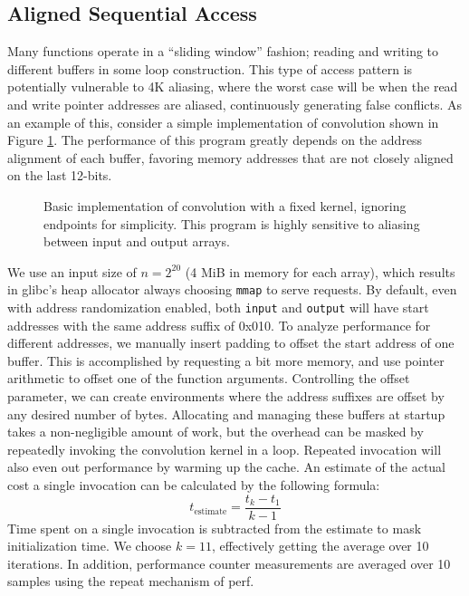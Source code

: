 \documentclass[10pt, conference, compsocconf]{IEEEtran}
\begin{document}
\subsection{Aligned Sequential Access}
Many functions operate in a ``sliding window'' fashion; reading and writing to different buffers in some loop construction.
This type of access pattern is potentially vulnerable to 4K aliasing, where the worst case will be when the read and write pointer addresses are aliased, continuously generating false conflicts.
As an example of this, consider a simple implementation of convolution shown in Figure \ref{lst:conv}.
The performance of this program greatly depends on the address alignment of each buffer, favoring memory addresses that are not closely aligned on the last 12-bits.

\begin{figure}[t]
  \centering
  
  \caption{Basic implementation of convolution with a fixed kernel, ignoring endpoints for simplicity. This program is highly sensitive to aliasing between input and output arrays.}
  \label{lst:conv}
\end{figure}

We use an input size of $n=2^{20}$ (4 MiB in memory for each array), which results in glibc's heap allocator always choosing \texttt{mmap} to serve requests.
By default, even with address randomization enabled, both \texttt{input} and \texttt{output} will have start addresses with the same address suffix of 0x010.
To analyze performance for different addresses, we manually insert padding to offset the start address of one buffer.
This is accomplished by requesting a bit more memory, and use pointer arithmetic to offset one of the function arguments.
Controlling the offset parameter, we can create environments where the address suffixes are offset by any desired number of bytes.
Allocating and managing these buffers at startup takes a non-negligible amount of work, but the overhead can be masked by repeatedly invoking the convolution kernel in a loop.
Repeated invocation will also even out performance by warming up the cache.
An estimate of the actual cost a single invocation can be calculated by the following formula:
\[
t_{\text{estimate}} = \frac{t_{k} - t_{1}}{k - 1}
\]
Time spent on a single invocation is subtracted from the estimate to mask initialization time.
We choose $k=11$, effectively getting the average over 10 iterations.
In addition, performance counter measurements are averaged over 10 samples using the repeat mechanism of perf.
\end{document}
